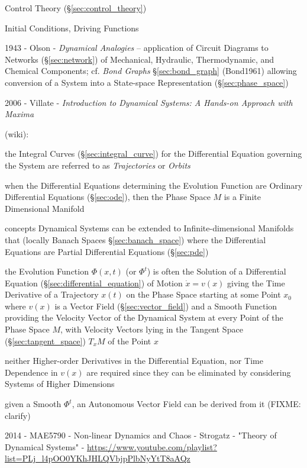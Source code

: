 Control Theory (\S\ref{sec:control_theory})

Initial Conditions, Driving Functions


1943 - Olson - \emph{Dynamical Analogies} -- application of Circuit Diagrams to
Networks (\S\ref{sec:network}) of Mechanical, Hydraulic, Thermodynamic, and
Chemical Components; cf. \emph{Bond Graphs} \S\ref{sec:bond_graph} (Bond1961)
allowing conversion of a System into a State-space Representation
(\S\ref{sec:phase_space})

2006 - Villate - \emph{Introduction to Dynamical Systems: A Hands-on Approach
  with Maxima}

(wiki):

the Integral Curves (\S\ref{sec:integral_curve}) for the Differential Equation
governing the System are referred to as \emph{Trajectories} or \emph{Orbits}

when the Differential Equations determining the Evolution Function are Ordinary
Differential Equations (\S\ref{sec:ode}), then the Phase Space $M$ is a Finite
Dimensional Manifold

concepts Dynamical Systems can be extended to Infinite-dimensional Manifolds
that (locally Banach Spaces \S\ref{sec:banach_space}) where the Differential
Equations are Partial Differential Equations (\S\ref{sec:pde})

the Evolution Function $\Phi(x,t)$ (or $\Phi^t$) is often the Solution of a
Differential Equation (\S\ref{sec:differential_equation}) of Motion $\dot{x} =
v(x)$ giving the Time Derivative of a Trajectory $x(t)$ on the Phase Space
starting at some Point $x_0$ where $v(x)$ is a Vector Field
(\S\ref{sec:vector_field}) and a Smooth Function providing the Velocity Vector
of the Dynamical System at every Point of the Phase Space $M$, with Velocity
Vectors lying in the Tangent Space (\S\ref{sec:tangent_space}) $T_xM$ of the
Point $x$

neither Higher-order Derivatives in the Differential Equation, nor Time
Dependence in $v(x)$ are required since they can be eliminated by considering
Systems of Higher Dimensions

given a Smooth $\Phi^t$, an Autonomous Vector Field can be derived from it
(FIXME: clarify)

\asterism

2014 - MAE5790 - Non-linear Dynamics and Chaos - Strogatz - "Theory of
Dynamical Systems" -
\url{https://www.youtube.com/playlist?list=PLj_l4pOO0YKhJHLQVbjpPlbNyYtT8aAQz}

